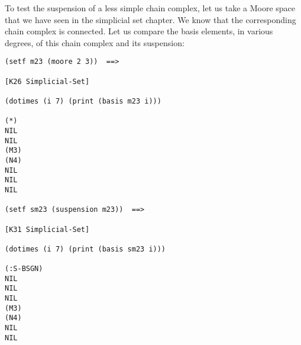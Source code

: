 To test the suspension of a less simple chain complex, let us take a Moore space that we have seen in the
simplicial set chapter.
We know that the corresponding  chain complex  is connected. Let us compare the
basis elements, in various degrees, of this chain complex and its suspension:
{\footnotesize\begin{verbatim}
(setf m23 (moore 2 3))  ==>

[K26 Simplicial-Set]

(dotimes (i 7) (print (basis m23 i)))

(*)
NIL
NIL
(M3)
(N4)
NIL
NIL
NIL

(setf sm23 (suspension m23))  ==>

[K31 Simplicial-Set]

(dotimes (i 7) (print (basis sm23 i)))

(:S-BSGN)
NIL
NIL
NIL
(M3)
(N4)
NIL
NIL
\end{verbatim}}

